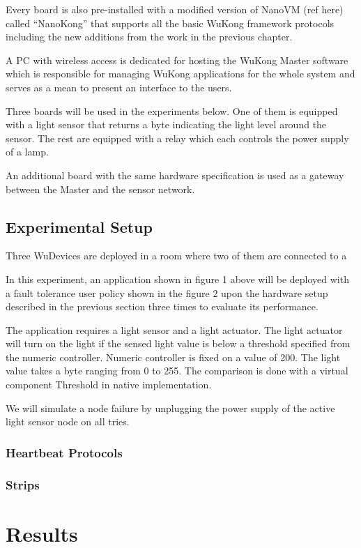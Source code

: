 Every board is also pre-installed with a modified version of NanoVM (ref here) called “NanoKong” that supports all the basic WuKong framework protocols including the new additions from the work in the previous chapter.

A PC with wireless access is dedicated for hosting the WuKong Master software which is responsible for managing WuKong applications for the whole system and serves as a mean to present an interface to the users.

Three boards will be used in the experiments below. One of them is equipped with a light sensor that returns a byte indicating the light level around the sensor. The rest are equipped with a relay which each controls the power supply of a lamp.

An additional board with the same hardware specification is used as a gateway between the Master and the sensor network.

\subsection{Experimental Setup}

Three WuDevices are deployed in a room where two of them are connected to a 


In this experiment, an application shown in figure 1 above will be deployed with a fault tolerance user policy shown in the figure 2 upon the hardware setup described in the previous section three times to evaluate its performance.

The application requires a light sensor and a light actuator. The light actuator will turn on the light if the sensed light value is below a threshold specified from the numeric controller. Numeric controller is fixed on a value of 200. The light value takes a byte ranging from 0 to 255. The comparison is done with a virtual component Threshold in native implementation.

We will simulate a node failure by unplugging the power supply of the active light sensor node on all tries.

\subsubsection{Heartbeat Protocols}

\subsubsection{Strips}

\section{Results}
\label{s:results}

